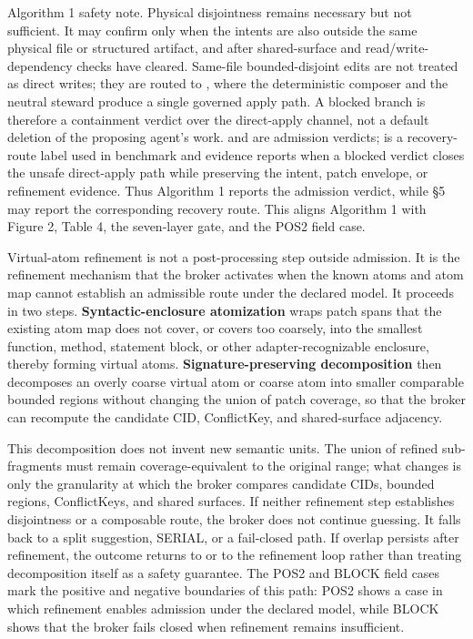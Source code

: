 \documentclass[9pt,letterpaper]{extarticle}
\begin{document}
Algorithm 1 safety note. Physical disjointness remains necessary but not sufficient. It may confirm \texttt{} only when the intents are also outside the same physical file or structured artifact, and after shared-surface and read/write-dependency checks have cleared. Same-file bounded-disjoint edits are not treated as direct \texttt{} writes; they are routed to \texttt{}, where the deterministic composer and the neutral steward produce a single governed apply path. A blocked branch is therefore a containment verdict over the direct-apply channel, not a default deletion of the proposing agent's work. \texttt{} and \texttt{} are admission verdicts; \texttt{} is a recovery-route label used in benchmark and evidence reports when a blocked verdict closes the unsafe direct-apply path while preserving the intent, patch envelope, or refinement evidence. Thus Algorithm 1 reports the admission verdict, while §5 may report the corresponding recovery route. This aligns Algorithm 1 with Figure 2, Table 4, the seven-layer gate, and the POS2 field case.

Virtual-atom refinement is not a post-processing step outside admission. It is the refinement mechanism that the broker activates when the known atoms and atom map cannot establish an admissible route under the declared model. It proceeds in two steps. \textbf{Syntactic-enclosure atomization} wraps patch spans that the existing atom map does not cover, or covers too coarsely, into the smallest function, method, statement block, or other adapter-recognizable enclosure, thereby forming virtual atoms. \textbf{Signature-preserving decomposition} then decomposes an overly coarse virtual atom or coarse atom into smaller comparable bounded regions without changing the union of patch coverage, so that the broker can recompute the candidate CID, ConflictKey, and shared-surface adjacency.

This decomposition does not invent new semantic units. The union of refined sub-fragments must remain coverage-equivalent to the original range; what changes is only the granularity at which the broker compares candidate CIDs, bounded regions, ConflictKeys, and shared surfaces. If neither refinement step establishes disjointness or a composable route, the broker does not continue guessing. It falls back to a split suggestion, SERIAL, or a fail-closed path. If overlap persists after refinement, the outcome returns to \texttt{} or to the refinement loop rather than treating decomposition itself as a safety guarantee. The POS2 and BLOCK field cases mark the positive and negative boundaries of this path: POS2 shows a case in which refinement enables admission under the declared model, while BLOCK shows that the broker fails closed when refinement remains insufficient.
\end{document}
